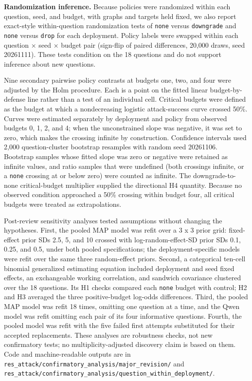 \documentclass[11pt]{article}
\begin{document}
\textbf{Randomization inference.} Because policies were randomized within each question, seed, and budget, with graphs and targets held fixed, we also report exact-style within-question randomization tests of \texttt{none} versus \texttt{downgrade} and \texttt{none} versus \texttt{drop} for each deployment. Policy labels were swapped within each question × seed × budget pair (sign-flip of paired differences, 20,000 draws, seed 20261111). These tests condition on the 18 questions and do not support inference about new questions.

Nine secondary pairwise policy contrasts at budgets one, two, and four were adjusted by the Holm procedure. Each is a point on the fitted linear budget-by-defense line rather than a test of an individual cell. Critical budgets were defined as the budget at which a nondecreasing logistic attack-success curve crossed 50\%. Curves were estimated separately by deployment and policy from observed budgets 0, 1, 2, and 4; when the unconstrained slope was negative, it was set to zero, which makes the crossing infinite by construction. Confidence intervals used 2,000 question-cluster bootstrap resamples with random seed 20261106. Bootstrap samples whose fitted slope was zero or negative were retained as infinite values, and ratio samples that were undefined (both crossings infinite, or a \texttt{none} crossing at or below zero) were counted as infinite. The downgrade-to-none critical-budget multiplier supplied the directional H4 quantity. Because no observed condition approached a 50\% crossing within budget four, all critical budgets were treated as extrapolations.

Post-review sensitivity analyses tested assumptions without changing the hypotheses. First, the pooled MAP model was refit over a 3 x 3 prior grid: fixed-effect prior SDs 2.5, 5, and 10 crossed with log-random-effect-SD prior SDs 0.1, 0.25, and 0.5, under both pooled specifications; the deployment-specific models were refit over the same three random-effect priors. Second, a categorical ten-cell binomial generalized estimating equation included deployment and seed fixed effects, an exchangeable working correlation, and sandwich covariance clustered over the 18 questions. Its H1 checks compared each \texttt{none} budget with control; H2 and H3 averaged the three positive-budget log-odds differences. Third, the pooled MAP model was refit 18 times, omitting one question at a time, and the Qwen model was refit omitting each pair of its four informative questions. Fourth, the pooled model was refit with the five failed first attempts substituted for their accepted replacements. These analyses are robustness checks, not new confirmatory tests; no multiplicity-adjusted discovery claim is based on them. Code and machine-readable outputs are in \nolinkurl{res_attack/confirmatory_analysis/major_revision/} and \nolinkurl{res_attack/confirmatory_analysis/question_within_deployment/}.
\end{document}
